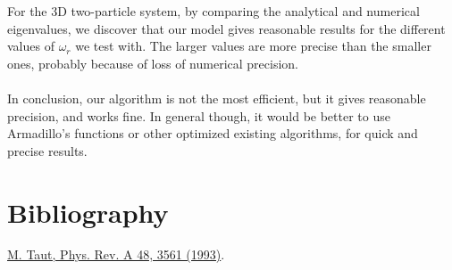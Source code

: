 \documentclass{article}
\begin{document}
	For the 3D two-particle system, by comparing the analytical and numerical eigenvalues, we discover that our model gives reasonable results for the different values of $\omega_r$ we test with. The larger values are more precise than the smaller ones, probably because of loss of numerical precision.\\\\

	In conclusion, our algorithm is not the most efficient, but it gives reasonable precision, and works fine. In general though, it would be better to use Armadillo's functions or other optimized existing algorithms, for quick and precise results.
	
\section{Bibliography}
	\href{http://prola.aps.org/abstract/PRA/v48/i5/p3561_1}{M. Taut, Phys. Rev. A 48, 3561 (1993)}.
\end{document}
